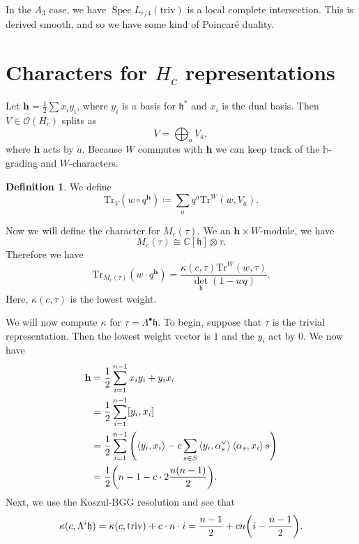 \documentclass[leqno, openany]{memoir}
\theoremstyle{definition}
\newtheorem{defn}[thm]{Definition}
\theoremstyle{remark}
\theoremstyle{plain}
\theoremstyle{definition}
\theoremstyle{remark}
\newcommand{\C}{\mathbb{C}}
\newcommand{\h}{\mathfrak{h}}
\newcommand{\mc}[1]{\mathcal{#1}}
\newcommand{\mr}[1]{\mathrm{#1}}
\newcommand{\1}{\mathbf{1}}
\newcommand{\2}{\mathbf{2}}
\newcommand{\3}{\mathbf{3}}
\DeclareMathOperator{\Spec}{Spec}
\begin{document}
In the $A_3$ case, we have $\Spec L_{r/4}(\mr{triv})$ is a local complete intersection. This is derived smooth, and so we have some kind of Poincar\'e duality.

\section{Characters for $H_c$ representations}%
\label{sec:characters_for_h_c_representations}

Let $\mathbf{h} = \frac{1}{2} \sum x_i y_i$, where $y_i$ is a basis for $\h^*$ and $x_i$ is the dual basis. Then $V \in \mc{O}(H_c)$ splits as
\[ V = \bigoplus_a V_a, \]
where $\mathbf{h}$ acts by $a$. Because $W$ commutes with $\mathbf{h}$ we can keep track of the $\mathbb{h}$-grading and $W$-characters.

\begin{defn}
    We define 
    \[ \mr{Tr}_V (w \circ q^{\mathbf{h}}) \coloneqq \sum_a q^a \mr{Tr}^W(w, V_a). \]
\end{defn}


Now we will define the character for $M_c(\tau)$. We an $\mathbf{h} \times W$-module, we have
\[ M_c(\tau) \cong \C[\h] \otimes \tau. \]
Therefore we have
\[ \mr{Tr}_{M_c(\tau)}(w \cdot q^{\mathbf{h}}) = \frac{\kappa(c, \tau) \mr{Tr}^W(w, \tau)}{\det_{\h} (1-wq)}. \]
Here, $\kappa(c, \tau)$ is the lowest weight.

We will now compute $\kappa$ for $\tau = \Lambda^{\bullet} \h$. To begin, suppose that $\tau$ is the trivial representation. Then the lowest weight vector is $1$ and the $y_i$ act by $0$. We now have
\begin{align*}
    \mathbf{h} &= \frac{1}{2} \sum_{i=1}^{n-1} x_i y_i + y_i x_i \\
    &= \frac{1}{2} \sum_{i=1}^{n-1} [y_i, x_i] \\
    &= \frac{1}{2} \sum_{i=1}^{n-1} \qty( \ev{y_i, x_i} - c \sum_{s \in S} \ev{y_i, \alpha_s^{\vee}} \ev{\alpha_s, x_i} s) \\
    &= \frac{1}{2} \qty(n-1-c \cdot 2 \frac{n(n-1)}{2}).
\end{align*}
Next, we use the Koszul-BGG resolution and see that
\[ \kappa(c, \Lambda^i \h) = \kappa(c, \mr{triv}) + c \cdot n \cdot i = \frac{n-1}{2} + cn\qty(i - \frac{n-1}{2}). \]
\end{document}
